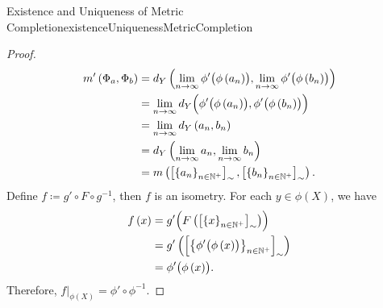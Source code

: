 \documentclass[math]{amznotes}
\theoremstyle{remark}
\begin{document}
\begin{thmbox}{Existence and Uniqueness of Metric Completion}{existenceUniquenessMetricCompletion}
\begin{proof}
        \begin{align*}
            m'\left(\Phi_a, \Phi_b\right) & = d_Y\left(\lim_{n \to \infty}\phi'\bigl(\phi\left(a_n\right)\bigr), \lim_{n \to \infty}\phi'\bigl(\phi\left(b_n\right)\bigr)\right) \\
            & = \lim_{n \to \infty}d_Y\Bigl(\phi'\bigl(\phi\left(a_n\right)\bigr), \phi'\bigl(\phi\left(b_n\right)\bigr)\Bigr) \\
            & = \lim_{n \to \infty}d_Y\left(a_n, b_n\right) \\
            & = d_Y\left(\lim_{n \to \infty}a_n, \lim_{n \to \infty}b_n\right) \\
            & = m\left(\left[\left\{a_n\right\}_{n \in \mathbb{N}^+}\right]_{\sim}, \left[\left\{b_n\right\}_{n \in \mathbb{N}^+}\right]_{\sim}\right).
        \end{align*}
        Define $f \coloneqq g' \circ F \circ g^{-1}$, then $f$ is an isometry. For each $y \in \phi\left(X\right)$, we have 
        \begin{align*}
            f\left(x\right) & = g'\Bigl(F\left(\left[\left\{x\right\}_{n \in \mathbb{N}^+}\right]_{\sim}\right)\Bigr) \\
            & = g'\left(\left[\left\{\phi'\bigl(\phi\left(x\right)\bigr)\right\}_{n \in \mathbb{N}^+}\right]_{\sim}\right) \\
            & = \phi'\bigl(\phi\left(x\right)\bigr).
        \end{align*}
        Therefore, $\left. f\right\rvert_{\phi\left(X\right)} = \phi' \circ \phi^{-1}$.
    \end{proof}
\end{thmbox}
\end{document}
